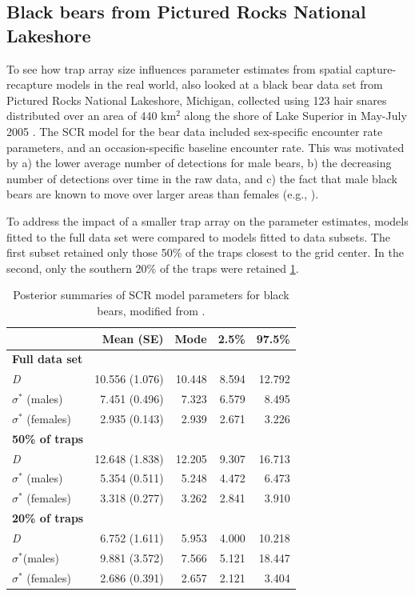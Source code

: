 \subsection{Black bears from Pictured Rocks National Lakeshore}

To see how trap array size influences parameter estimates from spatial
capture-recapture models in the real world, \citet{sollmann_etal:2012}
also looked at a black bear data set from Pictured Rocks National
Lakeshore, Michigan, collected using 123 hair snares distributed over
an area of 440 km$^2$ along the shore of Lake Superior in May-July
2005 \citep{belant_etal:2005}.  The SCR model for the bear data
included sex-specific
encounter rate parameters, and an occasion-specific baseline encounter
rate.
This was motivated by a) the lower average number of
detections for male bears, b) the decreasing number of detections
over time in the raw data, and c) the fact that male black bears are
known to move over larger areas than females (e.g.,
\citealp{gardner_etal:2010jwm, koehler_pierce:2003}).

To address the impact of a smaller trap array on the parameter
estimates, models fitted to the full data set were compared to
models fitted to data subsets.
The first subset retained only those 50\% of the traps
closest to the grid center. In the second, only the southern 20\% of
the traps were retained \ref{design.tab.bears}.

\begin{table}[ht]
  \centering
  \caption{Posterior summaries of SCR model parameters for black
    bears, modified from \citet{sollmann_etal:2012}.}
    \begin{tabular}{lrrrr}
	\hline
          & Mean (SE) & Mode  & 2.5\% & 97.5\% \\ \hline
    {\bf Full data set} &       &       &       &       \\
    {\it D } & 10.556 (1.076) & 10.448 & 8.594 & 12.792 \\
    $\sigma^*$ (males) & 7.451 (0.496) & 7.323 & 6.579 & 8.495 \\
    $\sigma^*$ (females) & 2.935 (0.143) & 2.939 & 2.671 & 3.226 \\
    {\bf 50\% of traps} &       &       &       &      \\
    {\it D } & 12.648 (1.838) & 12.205 & 9.307 & 16.713 \\
    $\sigma^*$ (males)  & 5.354 (0.511) & 5.248 & 4.472 & 6.473  \\
    $\sigma^*$ (females) & 3.318  (0.277) & 3.262 & 2.841 & 3.910 \\
    {\bf 20\% of traps} &       &       &       &        \\
    {\it D } & 6.752 (1.611) & 5.953 & 4.000 & 10.218  \\
    $\sigma^*$(males)  & 9.881 (3.572) & 7.566 & 5.121 & 18.447 \\
    $\sigma^*$ (females)  & 2.686 (0.391) & 2.657 & 2.121 & 3.404  \\
    \hline
    \end{tabular}
  \label{design.tab.bears}
\end{table}

